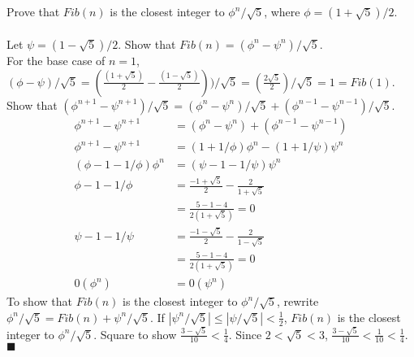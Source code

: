 \documentclass{article}
\begin{document}
\subsection{}
Prove that $Fib(n)$ is the closest integer to $\phi^n/\sqrt{5}$, where $\phi = (1 + \sqrt{5})/2$.\\ \\
Let $\psi = (1 - \sqrt{5})/2$. Show that $Fib(n) = (\phi^n - \psi^n)/\sqrt{5}$.\\
For the base case of $n = 1$, $(\phi - \psi)/\sqrt{5} = (\frac{(1 + \sqrt{5})}{2} - \frac{(1 - \sqrt{5})}{2}))/\sqrt{5} = (\frac{2\sqrt{5}}{2})/\sqrt{5} = 1 = Fib(1)$.\\
Show that $(\phi^{n+1} - \psi^{n+1})/\sqrt{5} = (\phi^n - \psi^n)/\sqrt{5} + (\phi^{n-1} - \psi^{n-1})/\sqrt{5}$.
\begin{align}
\phi^{n+1} - \psi^{n+1} &= (\phi^n - \psi^n) + (\phi^{n-1} - \psi^{n-1})\\
\phi^{n+1} - \psi^{n+1} &= (1 + 1/\phi)\phi^n - (1 + 1/\psi)\psi^n\\
(\phi - 1 - 1/\phi)\phi^n &= (\psi - 1 - 1/\psi)\psi^n\\
\phi - 1 - 1/\phi &= \frac{-1 + \sqrt{5}}{2} - \frac{2}{1 + \sqrt{5}}\\
                  &= \frac{5 - 1 - 4}{2(1 + \sqrt{5})} = 0\\
\psi - 1 - 1/\psi &= \frac{-1 - \sqrt{5}}{2} - \frac{2}{1 - \sqrt{5}}\\
                  &= \frac{5 - 1 - 4}{2(1 + \sqrt{5})} = 0\\
0(\phi^n) &= 0(\psi^n)
\end{align}
To show that $Fib(n)$ is the closest integer to $\phi^n/\sqrt{5}$, rewrite $\phi^n/\sqrt{5} = Fib(n) + \psi^n/\sqrt{5}$. If $|\psi^n/\sqrt{5}| \leq |\psi/\sqrt{5}| < \frac{1}{2}$, $Fib(n)$ is the closest integer to $\phi^n/\sqrt{5}$. Square to show $\frac{3-\sqrt{5}}{10} < \frac{1}{4}$. Since $2 < \sqrt{5} < 3$, $\frac{3-\sqrt{5}}{10} < \frac{1}{10} < \frac{1}{4}$. $\blacksquare$

\end{document}
